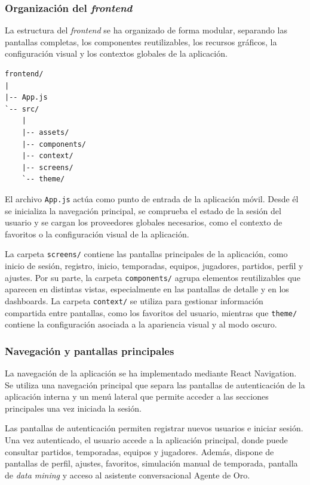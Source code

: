 \subsubsection{Organización del \textit{frontend}}

La estructura del \textit{frontend} se ha organizado de forma modular, separando las pantallas completas, los componentes reutilizables, los recursos gráficos, la configuración visual y los contextos globales de la aplicación.

\begin{lstlisting}[caption={Estructura del frontend.}]
frontend/
|
|-- App.js
`-- src/
    |
    |-- assets/
    |-- components/
    |-- context/
    |-- screens/
    `-- theme/
\end{lstlisting}

El archivo \texttt{App.js} actúa como punto de entrada de la aplicación móvil. Desde él se inicializa la navegación principal, se comprueba el estado de la sesión del usuario y se cargan los proveedores globales necesarios, como el contexto de favoritos o la configuración visual de la aplicación.

La carpeta \texttt{screens/} contiene las pantallas principales de la aplicación, como inicio de sesión, registro, inicio, temporadas, equipos, jugadores, partidos, perfil y ajustes. Por su parte, la carpeta \texttt{components/} agrupa elementos reutilizables que aparecen en distintas vistas, especialmente en las pantallas de detalle y en los dashboards. La carpeta \texttt{context/} se utiliza para gestionar información compartida entre pantallas, como los favoritos del usuario, mientras que \texttt{theme/} contiene la configuración asociada a la apariencia visual y al modo oscuro.

\subsubsection{Navegación y pantallas principales}

La navegación de la aplicación se ha implementado mediante React Navigation. Se utiliza una navegación principal que separa las pantallas de autenticación de la aplicación interna y un menú lateral que permite acceder a las secciones principales una vez iniciada la sesión.

Las pantallas de autenticación permiten registrar nuevos usuarios e iniciar sesión. Una vez autenticado, el usuario accede a la aplicación principal, donde puede consultar partidos, temporadas, equipos y jugadores. Además, dispone de pantallas de perfil, ajustes, favoritos, simulación manual de temporada, pantalla de \textit{data mining} y acceso al asistente conversacional Agente de Oro.

